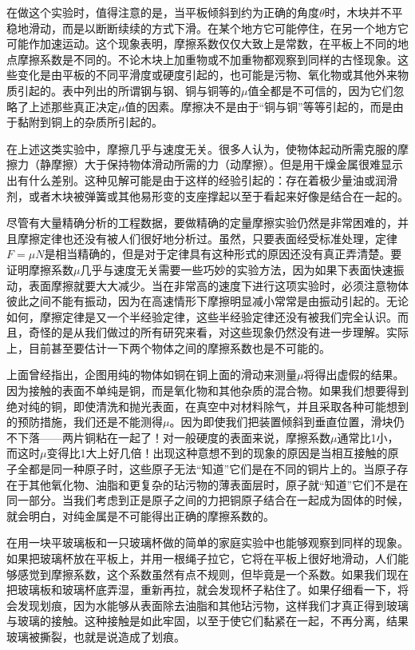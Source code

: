 在做这个实验时，值得注意的是，当平板倾斜到约为正确的角度$\theta$时，木块并不平稳地滑动，而是以断断续续的方式下滑。在某个地方它可能停住，在另一个地方它可能作加速运动。这个现象表明，摩擦系数仅仅大致上是常数，在平板上不同的地点摩擦系数是不同的。不论木块上加重物或不加重物都观察到同样的古怪现象。这些变化是由平板的不同平滑度或硬度引起的，也可能是污物、氧化物或其他外来物质引起的。表中列出的所谓钢与钢、铜与铜等的$\mu$值全都是不可信的，因为它们忽略了上述那些真正决定$\mu$值的因素。摩擦决不是由于“铜与铜”等等引起的，而是由于黏附到铜上的杂质所引起的。

在上述这类实验中，摩擦几乎与速度无关。很多人认为，使物体起动所需克服的摩擦力（静摩擦）大于保持物体滑动所需的力（动摩擦）。但是用干燥金属很难显示出有什么差别。这种见解可能是由于这样的经验引起的：存在着极少量油或润滑剂，或者木块被弹簧或其他易形变的支座撑起以至于看起来好像是结合在一起的。

尽管有大量精确分析的工程数据，要做精确的定量摩擦实验仍然是非常困难的，并且摩擦定律也还没有被人们很好地分析过。虽然，只要表面经受标准处理，定律$F=\mu N$是相当精确的，但是对于定律具有这种形式的原因还没有真正弄清楚。要证明摩擦系数$\mu$几乎与速度无关需要一些巧妙的实验方法，因为如果下表面快速振动，表面摩擦就要大大减少。当在非常高的速度下进行这项实验时，必须注意物体彼此之间不能有振动，因为在高速情形下摩擦明显减小常常是由振动引起的。无论如何，摩擦定律是又一个半经验定律，这些半经验定律还没有被我们完全认识。而且，奇怪的是从我们做过的所有研究来看，对这些现象仍然没有进一步理解。实际上，目前甚至要估计一下两个物体之间的摩擦系数也是不可能的。

上面曾经指出，企图用纯的物体如铜在铜上面的滑动来测量$\mu$将得出虚假的结果。因为接触的表面不单纯是铜，而是氧化物和其他杂质的混合物。如果我们想要得到绝对纯的铜，即使清洗和抛光表面，在真空中对材料除气，并且采取各种可能想到的预防措施，我们还是不能测得$\mu$。因为即使我们把装置倾斜到垂直位置，滑块仍不下落——两片铜粘在一起了！对一般硬度的表面来说，摩擦系数$\mu$通常比1小，而这时$\mu$变得比1大上好几倍！出现这种意想不到的现象的原因是当相互接触的原子全都是同一种原子时，这些原子无法“知道”它们是在不同的铜片上的。当原子存在于其他氧化物、油脂和更复杂的玷污物的薄表面层时，原子就“知道”它们不是在同一部分。当我们考虑到正是原子之间的力把铜原子结合在一起成为固体的时候，就会明白，对纯金属是不可能得出正确的摩擦系数的。

在用一块平玻璃板和一只玻璃杯做的简单的家庭实验中也能够观察到同样的现象。如果把玻璃杯放在平板上，并用一根绳子拉它，它将在平板上很好地滑动，人们能够感觉到摩擦系数，这个系数虽然有点不规则，但毕竟是一个系数。如果我们现在把玻璃板和玻璃杯底弄湿，重新再拉，就会发现杯子粘住了。如果仔细看一下，将会发现划痕，因为水能够从表面除去油脂和其他玷污物，这样我们才真正得到玻璃与玻璃的接触。这种接触是如此牢固，以至于使它们黏紧在一起，不再分离，结果玻璃被撕裂，也就是说造成了划痕。

